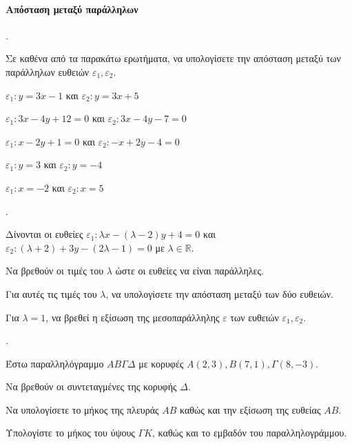 \documentclass[11pt,a4paper,twocolumn]{article}
\newcounter{askhsh}
\newcommand{\askhsh}{\large\theaskhsh.\ \addtocounter{askhsh}{1}}
\begin{document}
\paragraph{Απόσταση μεταξύ παράλληλων}
\askhsh Σε καθένα από τα παρακάτω ερωτήματα, να υπολογίσετε την απόσταση μεταξύ των παράλληλων ευθειών $\varepsilon_1,\varepsilon_2$.
\begin{alist}
\item $\varepsilon_1:y=3x-1$ και $\varepsilon_2:y=3x+5$
\item $\varepsilon_1:3x-4y+12=0$ και $\varepsilon_2:3x-4y-7=0$
\item $\varepsilon_1:x-2y+1=0$ και $\varepsilon_2:-x+2y-4=0$
\item $\varepsilon_1:y=3$ και $\varepsilon_2:y=-4$
\item $\varepsilon_1:x=-2$ και $\varepsilon_2:x=5$
\end{alist}
\askhsh Δίνονται οι ευθείες $\varepsilon_1:\lambda x-(\lambda-2)y+4=0$ και $\varepsilon_2:(\lambda+2)+3y-(2\lambda-1)=0$ με $\lambda\in\mathbb{R}$.
\begin{alist}
\item Να βρεθούν οι τιμές του $\lambda$ ώστε οι ευθείες να είναι παράλληλες.
\item Για αυτές τις τιμές του $\lambda$, να υπολογίσετε την απόσταση μεταξύ των δύο ευθειών.
\item Για $\lambda=1$, να βρεθεί η εξίσωση της μεσοπαράλληλης $\varepsilon$ των ευθειών $\varepsilon_1,\varepsilon_2$.
\end{alist}
\askhsh Έστω παραλληλόγραμμο $AB\varGamma\varDelta$ με κορυφές $A(2,3),B(7,1),\varGamma(8,-3)$.
\begin{alist}
\item Να βρεθούν οι συντεταγμένες της κορυφής $\varDelta$.
\item Να υπολογίσετε το μήκος της πλευράς $AB$ καθώς και την εξίσωση της ευθείας $AB$.
\item Υπολογίστε το μήκος του ύψους $\varGamma K$, καθώς και το εμβαδόν του παραλληλογράμμου.
\end{alist}
\end{document}
